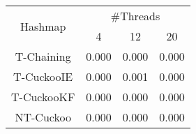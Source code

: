 \begin{tabular}{|c|c|c|c|}
\hline
\multirow{2}{*}{Hashmap} & \multicolumn{3}{c|}{\#Threads}\\\cline{2-4}& 4 & 12 & 20\\
\hline
\hline
T-Chaining & 0.000 & 0.000 & 0.000\\
T-CuckooIE & 0.000 & 0.001 & 0.000\\
T-CuckooKF & 0.000 & 0.000 & 0.000\\
NT-Cuckoo & 0.000 & 0.000 & 0.000\\
\hline
\end{tabular}
